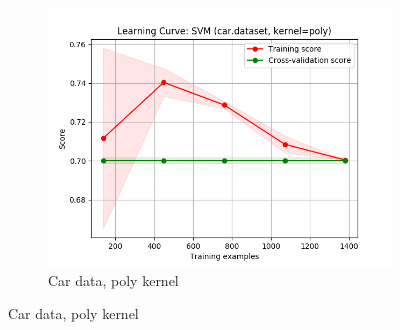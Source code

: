 \documentclass{article}
\begin{document}
\begin{figure}[htb]
\begin{subfigure}{0.33\textwidth}
      \includegraphics[width=\linewidth]{out/svm/car-kernel-poly.png}
      \caption{Car data, poly kernel}
      \label{fig:svm-learning-3}
    \end{subfigure}

    \medskip


\end{figure}
\end{document}
